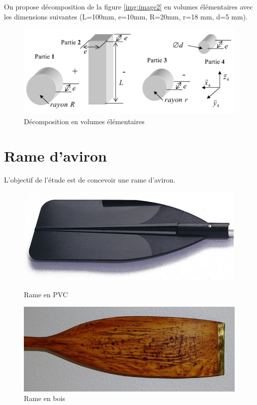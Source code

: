On propose décomposition de la figure \ref{img:image2} en volumes élémentaires avec les dimensions suivantes (L=100mm, e=10mm, R=20mm, r=18 mm, d=5 mm).

\begin{figure}[!h] 
  \centering\includegraphics[width=0.7\linewidth]{img/bool.png}
  \caption{Décomposition en volumes élémentaires}
  \label{img:image3}
\end{figure}

\newpage

\section{Rame d'aviron}
 
L'objectif de l'étude est de concevoir une rame d'aviron. 
 
\begin{figure}[!h]
 \begin{minipage}{0.49\linewidth}
  \centering\includegraphics[width=0.7\linewidth]{img/rame_pvc.jpg}
  \caption{Rame en PVC}
  \label{img:image4}
 \end{minipage}
\hfill
 \begin{minipage}{0.49\linewidth}
   \centering\includegraphics[width=0.7\linewidth]{img/rame_bois.jpg}
  \caption{Rame en bois}
  \label{img:image5}
 \end{minipage}
\end{figure}
 
